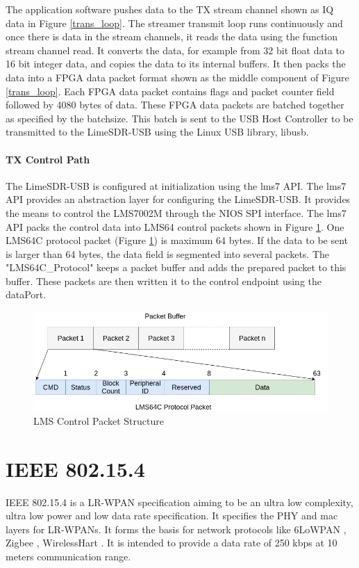The application software pushes data to the TX stream channel shown as IQ data in Figure \ref{trans_loop}.
The streamer transmit loop runs continuously and once there is data in the stream channels, it reads the data using the function stream channel read.
It converts the data, for example from 32 bit float data to 16 bit integer data, and copies the data to its internal buffers.
It then packs the data into a FPGA data packet format shown as the middle component of Figure \ref{trans_loop}.
Each \ac{FPGA} data packet contains flags and packet counter field followed by  4080 bytes of data.
These \ac{FPGA} data packets are batched together as specified by the batchsize.
This batch is sent to the USB Host Controller to be transmitted to the LimeSDR-USB using the Linux USB library, libusb.

\paragraph{TX Control Path} The LimeSDR-USB is configured at initialization using the lms7 \ac{API}.
The lms7 \ac{API} provides an abstraction layer for configuring the LimeSDR-USB.
It provides the means to control the LMS7002M through the NIOS SPI interface.
The lms7 API packs the control data into LMS64 control packets shown in Figure \ref{lms_packet}.
One LMS64C protocol packet (Figure \ref{lms_packet}) is maximum 64 bytes.
If the data to be sent is larger than 64 bytes, the data field is segmented into several packets.
The "LMS64C\_Protocol" keeps a packet buffer and adds the prepared packet to this buffer.
These packets are then written it to the control endpoint using the dataPort.



\begin{figure}[h!]
\centering
\includegraphics[width=\textwidth]{Figure/LMS64C_Packet.png}
\caption{LMS Control Packet Structure}
\label{lms_packet}
\end{figure}

\section{IEEE 802.15.4}
IEEE 802.15.4 \cite{noauthor_ieee_2016} is a \ac{LR-WPAN} specification aiming to be an ultra low complexity, ultra low power and low data rate specification.
It specifies the \ac{PHY} and \ac{mac} layers for \ac{LR-WPAN}s.
It forms the basis for network protocols like \ac{6LoWPAN} \cite{noauthor_ipv6_nodate}, Zigbee \cite{noauthor_zigbee_nodate}, WirelessHart \cite{noauthor_hart_2016}.
It is intended to provide a data rate of 250 kbps at 10 meters communication range.\\


